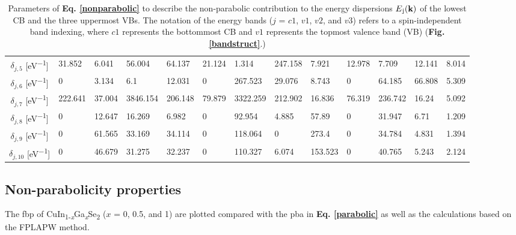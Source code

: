 \documentclass[a4paper, 12pt, titlepage,oneside,drop]{kthesis}
\begin{document}
\begin{table}
{\begin{tabular}{c l l l l l l l l l l l l }
$\delta_{j,5}$   [eV\textsuperscript{$-$1}]      & 31.852	&6.041	 &56.004  &64.137  &21.124  &1.314   &247.158 &7.921   &12.978	&7.709	  &12.141  &   8.014 \\
$\delta_{j,6}$   [eV\textsuperscript{$-$1}]      & 0	&3.134	 &6.1	  &12.031  & 0	    &267.523 &29.076  &8.743   &0	&64.185	  &66.808  &   5.309 \\
$\delta_{j,7}$   [eV\textsuperscript{$-$1}]      & 222.641&37.004	 &3846.154&206.148 &79.879  &3322.259&212.902 &16.836  &76.319  &236.742  &16.24   &   5.092 \\
$\delta_{j,8}$   [eV\textsuperscript{$-$1}]      & 0	&12.647	 &16.269  &6.982   &0	    &92.954  &4.885   &57.89   &0	&31.947	  &6.71	   &   1.209 \\
$\delta_{j,9}$   [eV\textsuperscript{$-$1}]      & 0	&61.565	 &33.169  &34.114  &0	    &118.064 &0	      &273.4   &0       &34.784   &4.831   &   1.394 \\
$\delta_{j,10}$  [eV\textsuperscript{$-$1}]      & 0	&46.679	 &31.275  &32.237  &0	    &110.327 &6.074   &153.523 &0	&40.765	  &5.243   &   2.124 \\
\hline
\end{tabular}}
\caption {Parameters of \textbf{Eq. \ref{nonparabolic}} to describe the non-parabolic contribution to the energy dispersions $E\textsubscript{j}(\textbf{k})$ of the lowest CB and the three uppermost VBs. The notation of the energy 
bands ($j$ = $c1$, $v1$, $v2$, and $v3$) refers to a spin-independent band indexing, where $c1$ represents the bottommost CB and $v1$ represents the topmost valence band (VB) (\textbf{Fig. \ref{bandstruct}}.)}\label{nonpara}
\end{table}


\subsection{Non-parabolicity properties}

The fbp of {CuIn\textsubscript{1-\textit{x}}Ga\textsubscript{\textit{x}}Se\textsubscript{2}} ($x$ = 0, 0.5, and 1) are plotted compared with the pba in \textbf{Eq. \ref{parabolic}} as well as the calculations based 
on the FPLAPW method.
\end{document}
